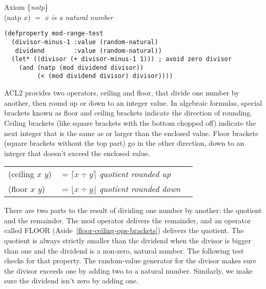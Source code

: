\label{natp-axiom-formal}
\begin{center}
Axiom \{\emph{natp}\} \\
(natp $x$) $=$ $x$ \emph{is a natural number}
\end{center}

\begin{Verbatim}
(defproperty mod-range-test
  (divisor-minus-1 :value (random-natural)
   dividend        :value (random-natural))
  (let* ((divisor (+ divisor-minus-1 1))) ; avoid zero divisor
    (and (natp (mod dividend divisor))
         (< (mod dividend divisor) divisor))))
\end{Verbatim}

\begin{aside}
ACL2 provides two operators,
ceiling and floor, that divide one number by another, 
then round up or down to an integer value.
In algebraic formulas, special brackets known as
floor and ceiling brackets indicate the direction of rounding.
Ceiling brackets (like square brackets with the bottom chopped off)
indicate the next integer that is the same as or larger than
the enclosed value.
Floor brackets (square brackets without the top part)
go in the other direction, down to an integer
that doesn't exceed the enclosed value.

\begin{center}
\begin{tabular}{lll}
(ceiling $x$ $y$)& $= \lceil x  \div y \rceil $ \emph{quotient rounded up}   \\
(floor $x$ $y$)  & $= \lfloor x \div y \rfloor$ \emph{quotient rounded down} \\
\end{tabular}
\end{center}

\caption{Floor and Ceiling Operators, Floor and Ceiling Brackets}
\label{floor-def}
\label{ceiling-def}
\label{floor-ceiling-ops-brackets}
\end{aside}

There are two parts to the result
of dividing one number by another: the quotient and the remainder.
The mod operator delivers the remainder,
and an operator called FLOOR (Aside~\ref{floor-ceiling-ops-brackets})
delivers the quotient.
The quotient is always strictly smaller
than the dividend when the divisor is bigger than one
and the dividend is a non-zero, natural number.
The following test checks for that property.
The random-value generator for the divisor
makes sure the divisor exceeds one by adding two
to a natural number.
Similarly, we make sure the dividend isn't zero by adding one.

